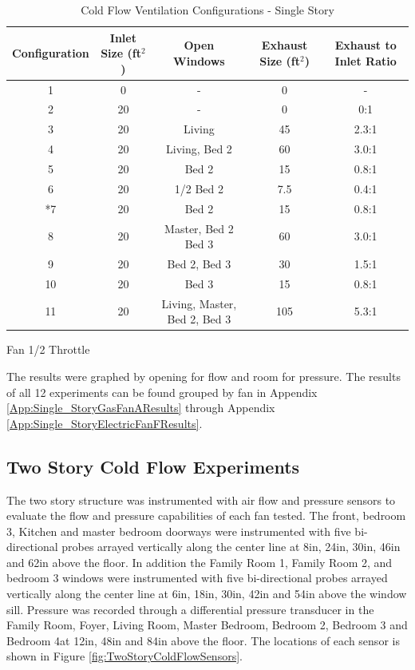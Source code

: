\documentclass{article}
\begin{document}
\begin{table} [H]
	\caption{Cold Flow Ventilation Configurations - Single Story}
	\begin{tabular}{|c|c|c|c|c|}
		\hline
		Configuration & Inlet Size (ft$^2$) & Open Windows & Exhaust Size (ft$^2$) & Exhaust to Inlet Ratio \\ \hline \hline
		1 & 0 & - & 0 & - \\ \hline
		2 & 20 & - & 0 & 0:1 \\ \hline
		3 & 20 & Living & 45 & 2.3:1 \\ \hline
		4 & 20 & Living, Bed 2 & 60 & 3.0:1 \\ \hline
		5 & 20 & Bed 2 & 15 & 0.8:1 \\ \hline
		6 & 20 & 1/2 Bed 2 & 7.5 & 0.4:1 \\ \hline
		*7 & 20 & Bed 2 & 15 & 0.8:1 \\ \hline
		8 & 20 & Master, Bed 2 Bed 3 & 60 & 3.0:1 \\ \hline
		9 & 20 & Bed 2, Bed 3 & 30 & 1.5:1 \\ \hline
		10 & 20 & Bed 3 & 15 & 0.8:1 \\ \hline
		11 & 20 & Living, Master, Bed 2, Bed 3 & 105 & 5.3:1 \\ \hline
	\end{tabular}
	\begin{tablenotes}
		\item *Fan 1/2 Throttle
	\end{tablenotes}
	\label{tab:ColdFlowConfig_SingleStory}
\end{table}


The results were graphed by opening for flow and room for pressure. The results of all 12 experiments can be found grouped by fan in Appendix \ref{App:Single_StoryGasFanAResults} through Appendix \ref{App:Single_StoryElectricFanFResults}. 

\subsection{Two Story Cold Flow Experiments}
The two story structure was instrumented with air flow and pressure sensors to evaluate the flow and pressure capabilities of each fan tested. The front, bedroom 3, Kitchen and master bedroom doorways were instrumented with five bi-directional probes arrayed vertically along the center line at 8in, 24in, 30in, 46in and 62in above the floor. In addition the Family Room 1, Family Room 2, and bedroom 3 windows were instrumented with five bi-directional probes arrayed vertically along the center line at 6in, 18in, 30in, 42in and 54in above the window sill. Pressure was recorded through a differential pressure transducer in the Family Room, Foyer, Living Room, Master Bedroom, Bedroom 2, Bedroom 3 and Bedroom 4at 12in, 48in and 84in above the floor. The locations of each sensor is shown in Figure \ref{fig:TwoStoryColdFlowSensors}. 
\end{document}
